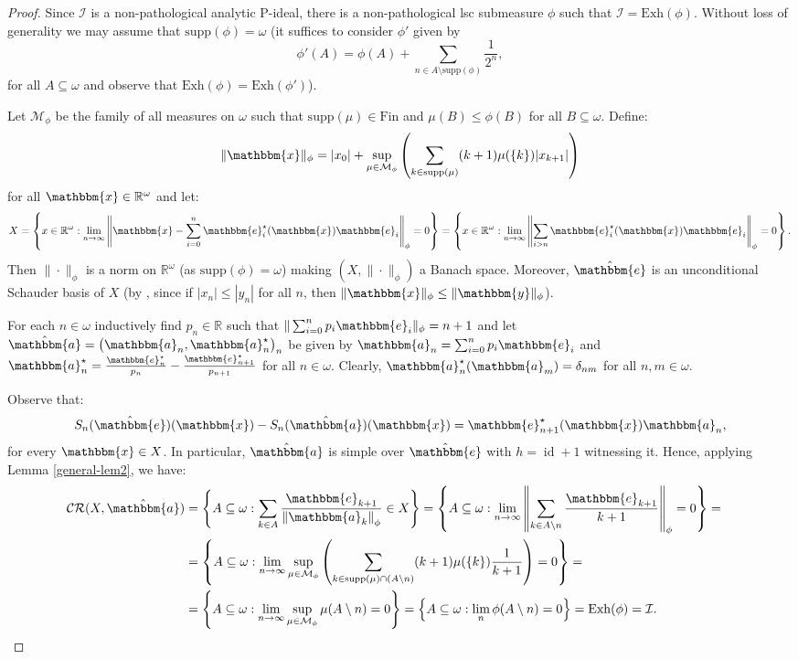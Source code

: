 \documentclass{amsart}
\newcommand{\on}{\operatorname}
\newcommand{\I}{\mathcal{I}}
\newcommand{\Fin}{\mathrm{Fin}}
\newcommand{\Exh}{\mathrm{Exh}}
\newcommand{\supp}{\mathrm{supp}}
\newcommand{\CR}{\mathcal{CR}}
\newcommand{\w}{\mathbbm}
\begin{document}
\begin{proof}
Since $\I$ is a non-pathological analytic P-ideal, there is a non-pathological lsc submeasure $\phi$ such that $\I=\Exh(\phi)$. Without loss of generality we may assume that $\supp(\phi)=\omega$ (it suffices to consider $\phi'$ given by 
\[
\phi'(A)=\phi(A)+\sum_{n\in A\setminus\supp(\phi)}\frac{1}{2^n},
\]
for all $A\subseteq\omega$ and observe that $\Exh(\phi)=\Exh(\phi')$). 

Let $\mathcal{M}_\phi$ be the family of all measures on $\omega$ such that $\supp(\mu)\in\Fin$ and $\mu(B)\leq\phi(B)$ for all $B\subseteq\omega$. Define:
\[
\|\w{x}\|_\phi=|x_0|+\sup_{\mu\in\mathcal{M}_\phi}\left(\sum_{k\in\supp(\mu)}(k+1)\mu(\{k\})|x_{k+1}|\right)
\]
for all $\w{x}\in\mathbb{R}^\omega$ and let:
\[
X=\left\{x\in\mathbb{R}^\omega: \lim_{n\to\infty}\left\|\w{x}-\sum_{i=0}^n \w{e}_i^\star(\w{x})\w{e}_i\right\|_\phi=0\right\}=\left\{x\in\mathbb{R}^\omega: \lim_{n\to\infty}\left\|\sum_{i>n} \w{e}_i^\star(\w{x})\w{e}_i\right\|_\phi=0\right\}.
\]
Then $\|\cdot\|_\phi$ is a norm on $\mathbb{R}^\omega$ (as $\supp(\phi)=\omega$) making $(X,\|\cdot\|_\phi)$ a Banach space. Moreover, $\hat{\w{e}}$ is an unconditional Schauder basis of $X$ (by \cite[Proposition 3.1.3]{AK}, since if $|x_n|\leq|y_n|$ for all $n$, then $\|\w{x}\|_\phi\leq\|\w{y}\|_\phi$).

For each $n\in\omega$ inductively find $p_n\in\mathbb{R}$ such that $\|\sum_{i=0}^n p_i\w{e}_i\|_\phi=n+1$ and let $\hat{\w{a}}=\left(\w{a}_n,\w{a}_n^\star\right)_n$ be given by $\w{a}_n = \sum_{i=0}^n p_i\w{e}_i $ and $\w{a}_n^\star=\frac{\w{e}_n^\star}{p_n} - \frac{\w{e}_{n+1}^\star}{p_{n+1}}$ for all $n\in\omega$. Clearly, $\w{a}^\star_n(\w{a}_m)=\delta_{nm}$ for all $n,m\in\omega$.

Observe that:
\[
S_n(\hat{\w{e}})(\w{x})-S_n(\hat{\w{a}})(\w{x})=\w{e}_{n+1}^\star(\w{x})\w{a}_{n},
\]
for every $\w{x}\in X$. In particular, $\hat{\w{a}}$ is simple over $\hat{\w{e}}$ with $h=\on{id}+1$ witnessing it. Hence, applying Lemma \ref{general-lem2}, we have:
\begin{align*}
\CR(X,\hat{\w{a}}) & =\left\{A\subseteq\omega: \sum_{k\in A}\frac{\w{e}_{k+1}}{\left\|\w{a}_k\right\|_\phi}\in X\right\}=\left\{A\subseteq\omega: \lim_{n\to\infty}\left\|\sum_{k\in A\setminus n} \frac{\w{e}_{k+1}}{k+1}\right\|_\phi=0\right\}=\cr
 & =\left\{A\subseteq\omega: \lim_{n\to\infty}\sup_{\mu\in\mathcal{M}_\phi}\left(\sum_{k\in\supp(\mu)\cap(A\setminus n)}(k+1)\mu(\{k\})\frac{1}{k+1}\right) =0\right\}=\cr
 & =\left\{A\subseteq\omega: \lim_{n\to\infty}\sup_{\mu\in\mathcal{M}_\phi}\mu(A\setminus n) =0\right\}= \left\{A\subseteq\omega: \lim_n\phi(A\setminus n) =0\right\}=\Exh(\phi)=\I.  
\end{align*}
\end{proof}
\end{document}
